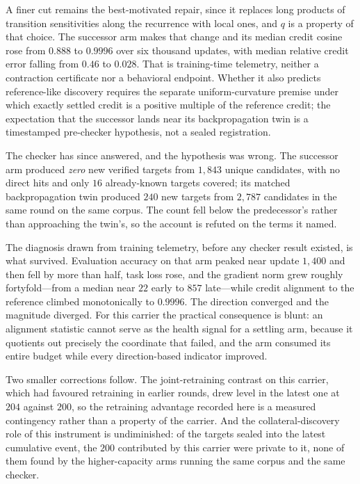 \documentclass[11pt]{article}
\begin{document}
A finer cut remains the best-motivated repair, since it replaces long products of
transition sensitivities along the recurrence with local ones, and $q$ is a property of
that choice.  The successor arm makes that change and its median credit cosine rose from
$0.888$ to $0.9996$ over six thousand updates, with median relative credit error falling
from $0.46$ to $0.028$.  That is training-time telemetry, neither a contraction
certificate nor a behavioral endpoint.  Whether it also predicts reference-like discovery
requires the separate uniform-curvature premise under which exactly settled credit is a
positive multiple of the reference credit; the expectation that the successor lands near
its backpropagation twin is a timestamped pre-checker hypothesis, not a sealed
registration.

The checker has since answered, and the hypothesis was wrong. The successor arm produced
\emph{zero} new verified targets from $1{,}843$ unique candidates, with no direct hits and
only $16$ already-known targets covered; its matched backpropagation twin produced $240$
new targets from $2{,}787$ candidates in the same round on the same corpus. The count fell
below the predecessor's rather than approaching the twin's, so the account is refuted on
the terms it named.

The diagnosis drawn from training telemetry, before any checker result existed, is what
survived. Evaluation accuracy on that arm peaked near update $1{,}400$ and then fell by
more than half, task loss rose, and the gradient norm grew roughly fortyfold---from a
median near $22$ early to $857$ late---while credit alignment to the reference climbed
monotonically to $0.9996$. The direction converged and the magnitude diverged. For this
carrier the practical consequence is blunt: an alignment statistic cannot serve as the
health signal for a settling arm, because it quotients out precisely the coordinate that
failed, and the arm consumed its entire budget while every direction-based indicator
improved.

Two smaller corrections follow. The joint-retraining contrast on this carrier, which had
favoured retraining in earlier rounds, drew level in the latest one at $204$ against
$200$, so the retraining advantage recorded here is a measured contingency rather than a
property of the carrier. And the collateral-discovery role of this instrument is
undiminished: of the targets sealed into the latest cumulative event, the $200$
contributed by this carrier were private to it, none of them found by the higher-capacity
arms running the same corpus and the same checker.
\end{document}
